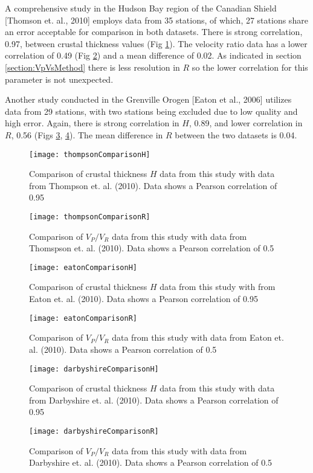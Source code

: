   A comprehensive study in the Hudson Bay region of the Canadian Shield [Thomson et. al., 2010] employs data from 35 stations, of which, 27 stations share an error acceptable for comparison in both datasets. There is strong correlation, 0.97, between crustal thickness values (Fig \ref{fig:thompsonCompH}). The velocity ratio data has a lower correlation of 0.49 (Fig \ref{fig:thompsonCompR}) and a mean difference of 0.02. As indicated in section \ref{section:VpVsMethod} there is less resolution in $R$ so the lower correlation for this parameter is not unexpected.

 Another study conducted in the Grenville Orogen [Eaton et al., 2006] utilizes data from 29 stations, with two stations being excluded due to low quality and high error. Again, there is strong correlation in $H$, 0.89, and lower correlation in $R$, 0.56 (Figs \ref{fig:eatonCompH}, \ref{fig:eatonCompR}). The mean difference in $R$ between the two datasets is 0.04.

\begin{figure}
  \centering
    \texttt{[image: thompsonComparisonH]}
  \caption{Comparison of crustal thickness $H$ data from this study with data from Thompson et. al. (2010). Data shows a Pearson correlation of 0.95}
  \label{fig:thompsonCompH}
\end{figure}

\begin{figure}
  \centering
    \texttt{[image: thompsonComparisonR]}
  \caption{Comparison of $V_P / V_R$ data from this study with data from Thomspson et. al. (2010). Data shows a Pearson correlation of 0.5}
  \label{fig:thompsonCompR}
\end{figure}

\begin{figure}
  \centering
    \texttt{[image: eatonComparisonH]}
  \caption{Comparison of crustal thickness $H$ data from this study with from Eaton et. al. (2010). Data shows a Pearson correlation of 0.95}
  \label{fig:eatonCompH}
\end{figure}

\begin{figure}
  \centering
  \texttt{[image: eatonComparisonR]}
  \caption{Comparison of $V_P / V_R$ data from this study with data from Eaton et. al. (2010). Data shows a Pearson correlation of 0.5}
  \label{fig:eatonCompR}
\end{figure}

\begin{figure}
  \centering
  \texttt{[image: darbyshireComparisonH]}
  \caption{Comparison of crustal thickness $H$ data from this study with data from Darbyshire et. al. (2010). Data shows a Pearson correlation of 0.95}
  \label{fig:darbyshireCompH}
\end{figure}

\begin{figure}
  \centering
  \texttt{[image: darbyshireComparisonR]}
  \caption{Comparison of $V_P / V_R$ data from this study with data from Darbyshire et. al. (2010). Data shows a Pearson correlation of 0.5}
  \label{fig:darbyshireCompR}
\end{figure}
